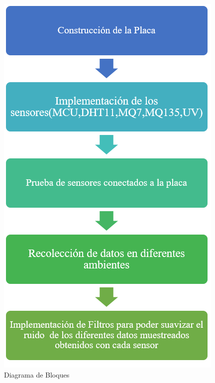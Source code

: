 \documentclass[10pt,a4paper]{article}
\begin{document}
\begin{multicols}{2}
\begin{itemize}
\begin{figure}[H]
\centering
\includegraphics[scale=0.7]{bloquesDiagrama.PNG}
\caption{Diagrama de Bloques}
\end{figure}


\end{itemize}
\end{multicols}
\end{document}
